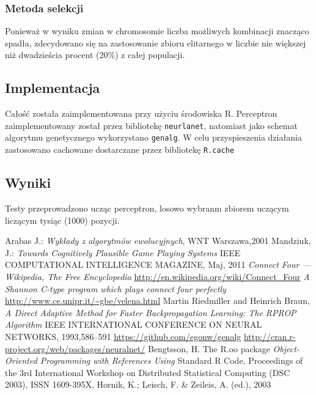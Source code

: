 \documentclass{llncs}
\begin{document}
\subsubsection{Metoda selekcji}
Ponieważ w wyniku zmian w chromosomie liczba możliwych kombinacji znacząco spadła, zdecydowano się na 
zastosowanie zbioru elitarnego w liczbie nie większej niż dwadzieścia procent (20\%) z całej populacji.

\subsection{Implementacja}
Całość została zaimplementowana przy użyciu środowiska R. Perceptron zaimplementowany został
przez bibliotekę \texttt{neurlanet}\cite{R:neuralnet}, natomiast jako schemat algorytmu genetycznego wykorzystano
\texttt{genalg}\cite{R:genalg}. W celu przyspieszenia działania zastosowano cachowane dostarczane przez bibliotekę
\texttt{R.cache}\cite{R:cache}

\subsection{Wyniki}
Testy przeprowadzono ucząc perceptron, losowo wybranm zbiorem uczącym liczącym tysiąc (1000) pozycji.	

%
%
\begin{thebibliography}{4}
%
Arabas J.:
\textsl{Wykłady z algorytmów ewolucyjnych}, WNT Warszawa,2001
Mandziuk, J.:
\textsl{Towards Cognitively Plausible Game Playing Systems}
IEEE COMPUTATIONAL INTELLIGENCE MAGAZINE, Maj, 2011
\textsl{Connect Four --- {W}ikipedia{,} The Free Encyclopedia}
\url{http://en.wikipedia.org/wiki/Connect_Four}
\textsl{A Shannon C-type program which plays connect four perfectly}
\url{http://www.ce.unipr.it/~gbe/velena.html}
Martin Riedmiller and Heinrich Braun,
\textsl{A Direct Adaptive Method for Faster Backpropagation Learning: The RPROP Algorithm}
IEEE INTERNATIONAL CONFERENCE ON NEURAL NETWORKS, 1993,586--591
\url{https://github.com/egonw/genalg}
\url{http://cran.r-project.org/web/packages/neuralnet/}
Bengtsson, H. The R.oo package
\textsl{Object-Oriented Programming with References Using}
Standard R Code, Proceedings of the 3rd International Workshop on Distributed
Statistical Computing (DSC 2003), ISSN 1609-395X, Hornik, K.; Leisch, F. \& Zeileis,
A. (ed.), 2003
\end{thebibliography}
\end{document}
